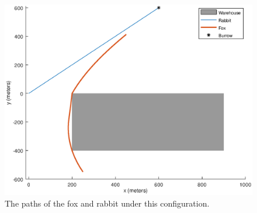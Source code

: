 \begin{figure}[h]
\centering

   \caption{The paths of the fox and rabbit under this configuration.}
   \includegraphics[scale=0.5]{simpleModel.eps}

      \label{fig:simplegraph}
\end{figure}
